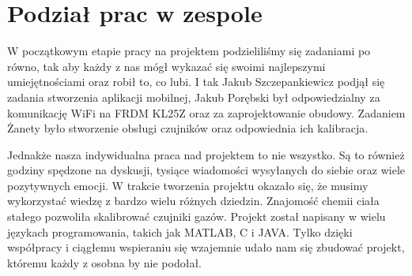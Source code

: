 \documentclass[12pt,a4paper]{article}
\begin{document}
\section{Podział prac w zespole}

W początkowym etapie pracy na projektem podzieliliśmy się zadaniami po równo, tak aby każdy z nas mógł wykazać się swoimi najlepszymi umiejętnościami oraz robił to, co lubi. I tak Jakub Szczepankiewicz podjął się zadania stworzenia aplikacji mobilnej, Jakub Porębski był odpowiedzialny za komunikację WiFi na FRDM KL25Z oraz za zaprojektowanie obudowy. Zadaniem Żanety było stworzenie obsługi czujników oraz odpowiednia ich kalibracja.

Jednakże nasza indywidualna praca nad projektem to nie wszystko. Są to również godziny spędzone na dyskusji, tysiące wiadomości wysyłanych do siebie oraz wiele pozytywnych emocji. W trakcie tworzenia projektu okazało się, że musimy wykorzystać wiedzę z bardzo wielu różnych dziedzin. Znajomość chemii ciała stałego pozwoliła skalibrować czujniki gazów. Projekt został napisany w wielu językach programowania, takich jak \mbox{MATLAB}, C i JAVA. Tylko dzięki współpracy i ciągłemu wspieraniu się wzajemnie udało nam się zbudować projekt, któremu każdy z osobna by nie podołał.







\end{document}
